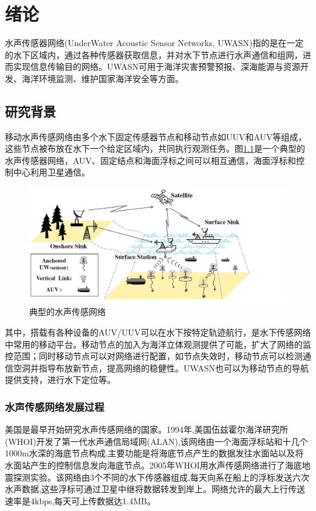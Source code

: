 \chapter{绪论}
水声传感器网络(UnderWater Acoustic Sensor Networks, UWASN)指的是在一定的水下区域内，通过各种传感器获取信息，并对水下节点进行水声通信和组网，进而实现信息传输目的网络\cite{范光宇2015水声传感网络的媒体接入控制技术}。UWASN可用于海洋灾害预警预报、深海能源与资源开发、海洋环境监测、维护国家海洋安全等方面。


\section{研究背景}
移动水声传感网络由多个水下固定传感器节点和移动节点如UUV和AUV等组成，这些节点被布放在水下一个给定区域内，共同执行观测任务。图\ref{f1}是一个典型的水声传感器网络，AUV、固定结点和海面浮标之间可以相互通信，海面浮标和控制中心利用卫星通信\cite{noh2012mac}。
\begin{figure}[ht]
	\centering
	\includegraphics[scale=0.25]{figures/1.png}
	\caption{
		典型的水声传感网络
	}
	\label{f1}
\end{figure}

其中，搭载有各种设备的AUV/UUV可以在水下按特定轨迹航行，是水下传感网络中常用的移动平台。移动节点的加入为海洋立体观测提供了可能，扩大了网络的监控范围；同时移动节点可以对网络进行配置，如节点失效时，移动节点可以检测通信空洞并指导布放新节点，提高网络的稳健性。UWASN也可以为移动节点的导航提供支持，进行水下定位等。

\subsection{水声传感网络发展过程}
美国是最早开始研究水声传感网络的国家。1994年,美国伍兹霍尔海洋研究所(WHOI)\cite{freitag2005whoi}开发了第一代水声通信局域网(ALAN),该网络由一个海面浮标站和十几个1000m水深的海底节点构成,主要功能是将海底节点产生的数据发往水面站以及将水面站产生的控制信息发向海底节点。2005年WHOI用水声传感网络进行了海底地震探测实验。该网络由3个不同的水下传感器组成,每天向系在船上的浮标发送六次水声数据,这些浮标可通过卫星中继将数据转发到岸上。网络允许的最大上行传送速率是4kbps,每天可上传数据达1.4MB。

